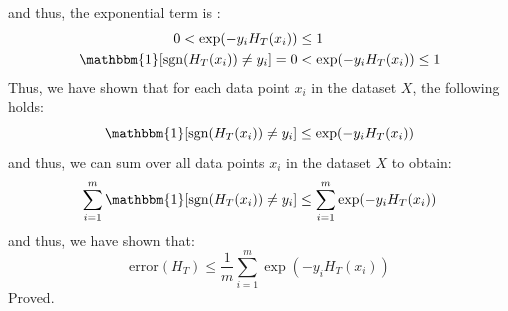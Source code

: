 \documentclass[11pt]{article}
\begin{document}
and thus, the exponential term is :
\begin{equation}
  \begin{split}
  0 < \exp(-y_iH_T(x_i)) &\leq 1 \\
  \mathbbm{1}[\text{sgn}(H_T(x_i)) \neq y_i] = 0 &<  \exp(-y_iH_T(x_i)) \leq 1
  \end{split}
\end{equation}
Thus, we have shown that for each data point $x_i$ in the dataset $X$, the following holds:
\begin{equation}
  \mathbbm{1}[\text{sgn}(H_T(x_i)) \neq y_i] \leq \exp(-y_iH_T(x_i))
\end{equation}
and thus, we can sum over all data points $x_i$ in the dataset $X$ to obtain:
\begin{equation}
  \sum_{i=1}^m \mathbbm{1}[\text{sgn}(H_T(x_i)) \neq y_i] \leq \sum_{i=1}^m \exp(-y_iH_T(x_i))
\end{equation}
and thus, we have shown that:
\begin{equation}
  \text{error}(H_T) \leq \frac{1}{m} \sum_{i=1}^m \exp(-y_iH_T(x_i))
\end{equation}
Proved.
\end{document}
